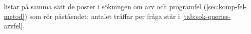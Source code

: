  listar på samma sätt de poster i sökningen om arv
och programfel (\cref{sec:komp-fel-metod}) som rör påståendet; antalet
träffar per fråga står i \cref{tab:sok-queries-arvfel}.
